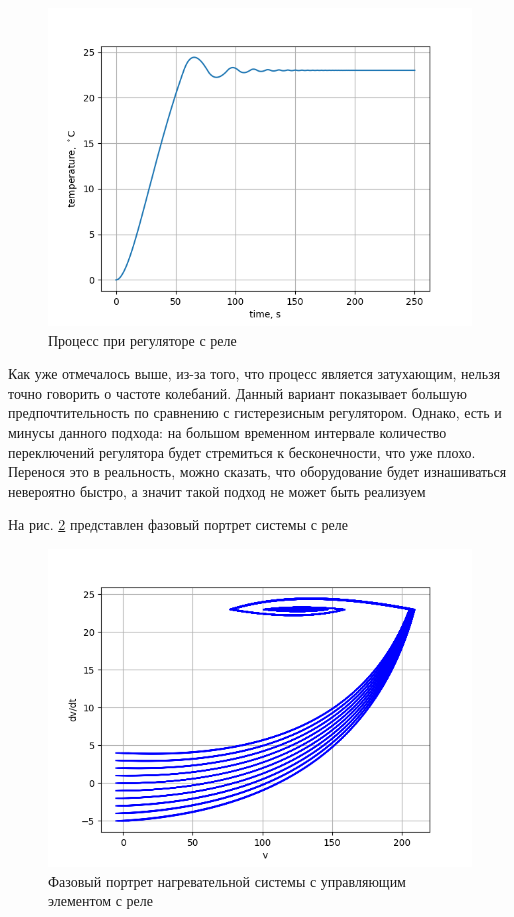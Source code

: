 \begin{figure}[H]
	\centering
	\includegraphics[width=1\linewidth]{body/images/relay-system.png}
	\caption{Процесс при регуляторе с реле}
	\label{fig:3}
\end{figure}

Как уже отмечалось выше, из-за того, что процесс является затухающим, нельзя точно говорить о частоте колебаний.
Данный вариант показывает большую предпочтительность по сравнению с гистерезисным регулятором. Однако, есть и минусы данного
подхода: на большом временном интервале количество переключений регулятора будет стремиться к бесконечности, что уже плохо.
Перенося это в реальность, можно сказать, что оборудование будет изнашиваться невероятно быстро, а значит такой подход
не может быть реализуем

На рис. \ref{fig:4} представлен фазовый портрет системы с реле

\begin{figure}[H]
	\centering
	\includegraphics[width=0.8\linewidth]{body/images/relay-system-phase-portrait.png}
	\caption{Фазовый портрет нагревательной системы с управляющим элементом с реле}
	\label{fig:4}
\end{figure}

